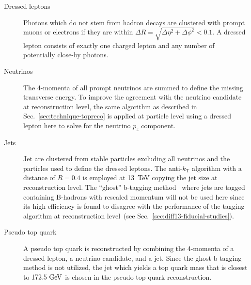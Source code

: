 
\begin{description}
\item[Dressed leptons] Photons which do not stem from hadron decays are clustered with prompt muons or electrons if they are within $\Delta R=\sqrt{\Delta\eta^2+\Delta\phi^2}<0.1$. A dressed lepton consists of exactly one charged lepton and any number of potentially close-by photons.
\item[Neutrinos] The 4-momenta of all prompt neutrinos are summed to define the missing transverse energy. To improve the agreement with the neutrino candidate at reconstruction level, the same algorithm as described in Sec.~\ref{sec:technique-topreco} is applied at particle level using a dressed lepton here to solve for the neutrino $p_{z}$ component.
\item[Jets] Jet are clustered from stable particles excluding all neutrinos and the particles used to define the dressed leptons. The anti-$k_\mathrm{T}$ algorithm with a distance of $R=0.4$ is employed at 13~TeV copying the jet size at reconstruction level. The ``ghost'' b-tagging method~\cite{Cacciari:2008gn} where jets are tagged containing B-hadrons with rescaled momentum will not be used here since its high efficiency is found to disagree with the performance of the tagging algorithm at reconstruction level~(see Sec.~\ref{sec:diff13-fiducial-studies}).
\item[Pseudo top quark] A pseudo top quark is reconstructed by combining the 4-momenta of a dressed lepton, a neutrino candidate, and a jet. Since the ghost b-tagging method is not utilized, the jet which yields a top quark mass that is closest to $172.5~\textrm{GeV}$ is chosen in the pseudo top quark reconstruction.
\end{description}

